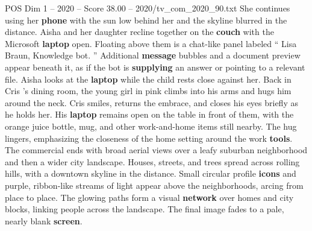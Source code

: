 \begin{textsample}{POS Dim 1 – 2020 – Score 38.00 – 2020/tv\_com\_2020\_90.txt}
She continues using her \textbf{phone} with the sun low behind her and the skyline blurred in the distance.
Aisha and her daughter recline together on the \textbf{couch} with the Microsoft \textbf{laptop} open.
Floating above them is a chat-like panel labeled “ Lisa Braun, Knowledge bot. ” Additional \textbf{message} bubbles and a document preview appear beneath it, as if the bot is \textbf{supplying} an answer or pointing to a relevant file.
Aisha looks at the \textbf{laptop} while the child rests close against her.
Back in Cris ’s dining room, the young girl in pink climbs into his arms and hugs him around the neck.
Cris smiles, returns the embrace, and closes his eyes briefly as he holds her.
His \textbf{laptop} remains open on the table in front of them, with the orange juice bottle, mug, and other work-and-home items still nearby.
The hug lingers, emphasizing the closeness of the home setting around the work \textbf{tools}.
The commercial ends with broad aerial views over a leafy suburban neighborhood and then a wider city landscape.
Houses, streets, and trees spread across rolling hills, with a downtown skyline in the distance.
Small circular profile \textbf{icons} and purple, ribbon-like streams of light appear above the neighborhoods, arcing from place to place.
The glowing paths form a visual \textbf{network} over homes and city blocks, linking people across the landscape.
The final image fades to a pale, nearly blank \textbf{screen}.

\end{textsample}
